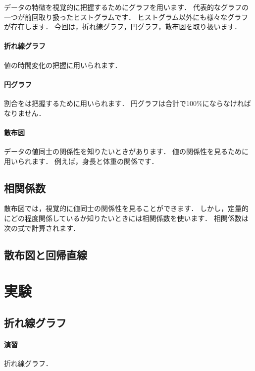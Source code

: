 \documentclass[12pt, a4j]{jreport}
\begin{document}
データの特徴を視覚的に把握するためにグラフを用います．
代表的なグラフの一つが前回取り扱ったヒストグラムです．
ヒストグラム以外にも様々なグラフが存在します．
今回は，折れ線グラフ，円グラフ，散布図を取り扱います．

\paragraph{折れ線グラフ}

値の時間変化の把握に用いられます．

\paragraph{円グラフ}

割合をは把握するために用いられます．
円グラフは合計で100\%にならなければなりません．

\paragraph{散布図}

データの値同士の関係性を知りたいときがあります．
値の関係性を見るために用いられます．
例えば，身長と体重の関係です．

\subsection{相関係数}

散布図では，視覚的に値同士の関係性を見ることができます．
しかし，定量的にどの程度関係しているか知りたいときには相関係数を使います．
相関係数は次の式で計算されます．

\subsection{散布図と回帰直線}



\section{実験}


\subsection{折れ線グラフ}



\paragraph{演習}
折れ線グラフ．
\end{document}
